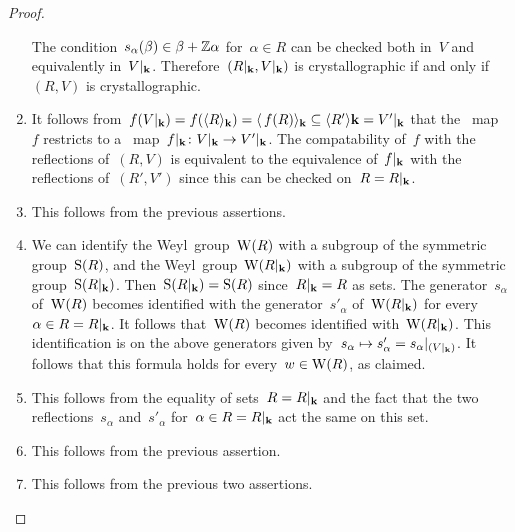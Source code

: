 \begin{proof}
\begin{enumerate}
      The condition~$s_\alpha(\beta) \in \beta + \mathbb{Z} \alpha$ for~$\alpha \in R$ can be checked both in~$V$ and equivalently in~$\restrict{V}{\kf}$.
      Therefore~$(\restrict{R}{\kf}, \restrict{V}{\kf})$ is crystallographic if and only if~$(R, V)$ is crystallographic.
    \item
      It follows from~$f(\restrict{V}{\kf}) = f(\gen{R}_{\kf}) = \gen{\spacing f(R)}_{\kf} \subseteq \gen{R'}{\kf} = \restrict{V'}{\kf}$ that the~{\linear{$\Lf$}} map~$f$ restricts to a~{\linear{$\kf$}} map~$\restrict{f}{\kf} \colon \restrict{V}{\kf} \to \restrict{V'}{\kf}$.
      The compatability of~$f$ with the reflections of~$(R,V)$ is equivalent to the equivalence of~$\restrict{f}{\kf}$ with the reflections of~$(R',V')$ since this can be checked on~$R = \restrict{R}{\kf}$.
    \item
      This follows from the previous assertions.
    \item
      We can identify the Weyl~group~$\operatorname{W}(R)$ with a subgroup of the symmetric group~$\operatorname{S}(R)$, and the Weyl~group~$\Weyl(\restrict{R}{\kf})$ with a subgroup of the symmetric group~$\Symm(\restrict{R}{\kf})$.
      Then~$\Symm(\restrict{R}{\kf}) = \Symm(R)$ since~$\restrict{R}{\kf} = R$ as sets.
      The generator~$s_\alpha$ of~$\operatorname{W}(R)$ becomes identified with the generator~$s'_\alpha$ of~$\Weyl(\restrict{R}{\kf})$ for every~$\alpha \in R = \restrict{R}{\kf}$.
      It follows that~$\operatorname{W}(R)$ becomes identified with~$\Weyl(\restrict{R}{\kf})$.
      This identification is on the above generators given by~$s_\alpha \mapsto s'_\alpha = \restrict{s_\alpha}{(\restrict{V}{\kf})}$.
      It follows that this formula holds for every~$w \in \operatorname{W}(R)$, as claimed.
    \item
      This follows from the equality of sets~$R = \restrict{R}{\kf}$ and the fact that the two reflections~$s_\alpha$ and~$s'_\alpha$ for~$\alpha \in R = \restrict{R}{\kf}$ act the same on this set.
    \item
      This follows from the previous assertion.
    \item
      This follows from the previous two assertions.
    \qedhere
  \end{enumerate}
\end{proof}


